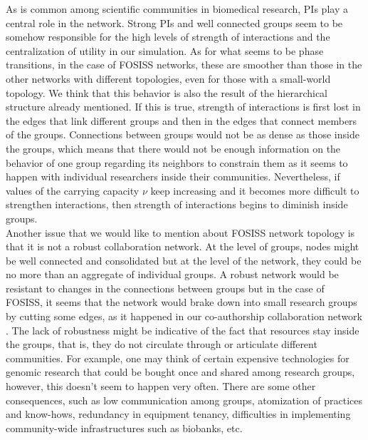 \documentclass{bmcart}
\begin{document}
 As is common among scientific communities in biomedical
  research, PIs play a central role in the network. Strong PIs and
  well connected groups seem to be somehow responsible for the high
  levels of strength of interactions and the centralization of utility
  in our simulation. As for what seems to be phase transitions, in the
  case of FOSISS networks, these are smoother than those in the other
  networks with different topologies, even for those with a
  small-world topology. We think that this behavior is also the result
  of the hierarchical structure already mentioned. If this is true,
  strength of interactions is first lost in the edges that link
  different groups and then in the edges that connect members of the
  groups. Connections between groups would not be as dense as those
  inside the groups, which means that there would not be enough
  information on the behavior of one group regarding its neighbors to
  constrain them as it seems to happen with individual researchers
  inside their communities. Nevertheless, if values of the carrying
  capacity $\nu$ keep increasing and it becomes more difficult to
  strengthen interactions, then strength of interactions begins to
  diminish inside groups.\\

  Another issue that we would like to mention about FOSISS network
  topology is that it is not a robust collaboration network.  At the
  level of groups, nodes might be well connected and consolidated but
  at the level of the network, they could be no more than an aggregate
  of individual groups. A robust network would be resistant to changes
  in the connections between groups but in the case of FOSISS, it
  seems that the network would brake down into small research groups
  by cutting some edges, as it happened in our co-authorship
  collaboration network \cite{HernandezLemus:2013}. The lack of
  robustness might be indicative of the fact that resources stay
  inside the groups, that is, they do not circulate through or
  articulate different communities. For example, one may think of
  certain expensive technologies for genomic research that could be
  bought once and shared among research groups, however, this doesn't
  seem to happen very often. There are some other consequences, such
  as low communication among groups, atomization of practices and
  know-hows, redundancy in equipment tenancy, difficulties in
  implementing community-wide infrastructures such as biobanks,
  etc. \\
\end{document}
